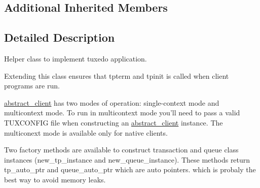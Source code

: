 \subsection*{Additional Inherited Members}


\subsection{Detailed Description}
Helper class to implement tuxedo application.

Extending this class ensures that tpterm and tpinit is called when client programs are run.

\hyperlink{classatmi_1_1abstract__client}{abstract\+\_\+client} has two modes of operation\+: single-\/context mode and multicontext mode. To run in multicontext mode you'll need to pass a valid T\+U\+X\+C\+O\+N\+F\+I\+G file when constructing an \hyperlink{classatmi_1_1abstract__client}{abstract\+\_\+client} instance. The multiconext mode is available only for native clients.

Two factory methods are available to construct transaction and queue class instances (new\+\_\+tp\+\_\+instance and new\+\_\+queue\+\_\+instance). These methods return tp\+\_\+auto\+\_\+ptr and queue\+\_\+auto\+\_\+ptr which are auto pointers. which is probaly the best way to avoid memory leaks. 


